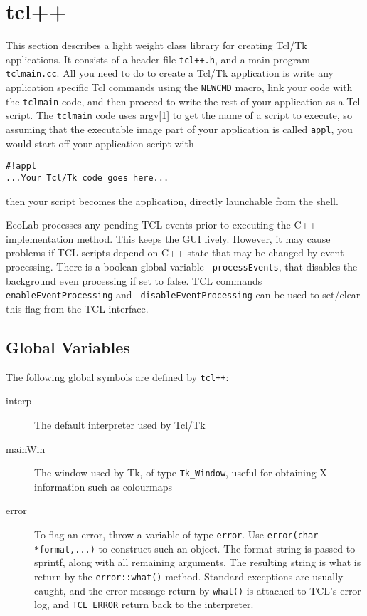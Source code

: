 \section{tcl++}\label{tcl++}

This section describes a light weight class library for creating
Tcl/Tk applications. \cite{Ousterhout94} It consists of a header file
\verb|tcl++.h|, and a main program \verb|tclmain.cc|. All you need to
do to create a Tcl/Tk application is write any application specific
Tcl commands using the {\tt NEWCMD}\label{NEWCMD} macro, link your code with the
\verb|tclmain| code, and then proceed to write the rest of your
application as a Tcl script. The \verb|tclmain| code uses argv[1] to
get the name of a script to execute, so assuming that the executable
image part of your application is called \verb|appl|, you would
start off your application script with
\begin{verbatim}
#!appl
...Your Tcl/Tk code goes here...
\end{verbatim}
then your script becomes the application, directly launchable from the
shell.

EcoLab processes any pending TCL events prior to executing the C++
implementation method. This keeps the GUI lively. However, it may
cause problems if TCL scripts depend on C++ state that may be changed
by event processing. There is a boolean global variable {\tt
  processEvents}, that disables the background
even processing if set to false. TCL commands {\tt
  enableEventProcessing} and {\tt
  disableEventProcessing} can be used to
set/clear this flag from the TCL interface.

\subsection{Global Variables}

The following global symbols are defined by \verb|tcl++|:
\begin{description}
\item[interp] The default interpreter used by Tcl/Tk
\item[mainWin] The window used by Tk, of type
  \verb|Tk_Window|, useful for obtaining X information such as
  colourmaps
\item[error] To flag an error, throw a variable of type
  \verb+error+. Use \verb|error(char *format,...)| to construct such
  an object.
The format string is passed to sprintf, along with all remaining
arguments. The resulting string is what is return by the
  \verb+error::what()+ method. Standard execptions are usually caught,
  and the error message return by \verb+what()+ is attached to TCL's
  error log, and \verb+TCL_ERROR+ return back to the interpreter.
\end{description}

